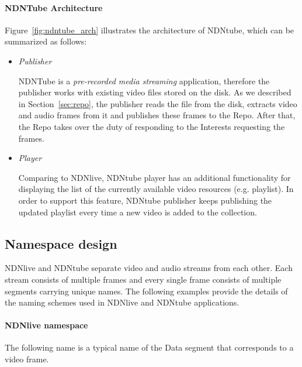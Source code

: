 \paragraph{NDNTube Architecture} %
\vspace{0.3cm}
\label{par:ndntube_arch}
Figure~\ref{fig:ndntube_arch} illustrates the architecture of NDNtube, which can be summarized as follows:
\begin{itemize}
  \item \textit{Publisher}

    NDNTube is a \textit{pre-recorded media streaming} application, therefore the publisher works with existing video files stored on the disk. As we described in Section~\ref{sec:repo}, the publisher reads the file from the disk, extracts video and audio frames from it and publishes these frames to the Repo. After that, the Repo takes over the duty of responding to the Interests requesting the frames. 

  \item \textit{Player}

    Comparing to NDNlive, NDNtube player has an additional functionality for displaying the list of the currently available video resources (e.g. playlist). In order to support this feature, NDNtube publisher keeps publishing the updated playlist every time a new video is added to the collection.

\end{itemize}


\subsection{Namespace design}

NDNlive and NDNtube separate video and audio streams from each other. Each stream consists of multiple frames and every single frame consists of multiple segments carrying unique names. The following examples provide the details of the naming schemes used in NDNlive and NDNtube applications.

\paragraph{NDNlive namespace} %
\label{par:ndnlive_naming}
\vspace{0.3cm}
The following name is a typical name of the Data segment that corresponds to a video frame.

